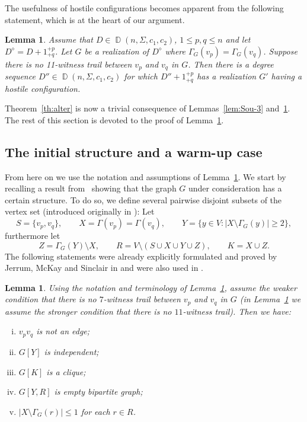 \documentclass[11pt]{elsarticle}
\theoremstyle{plain}
\newtheorem{lemma}[theorem]{Lemma}
\theoremstyle{definition}
\newcommand{\dds}[4]{\operatorname{\mathbb D}(#1,#2,#3,#4)}
\begin{document}
The usefulness of hostile configurations becomes apparent from the following statement, which is at the heart of our argument.

\begin{lemma}\label{lem:key}
   Assume that  $D\in \dds{n}{\Sigma}{c_1}{c_2}$, $1\le p,q\le n$ and  let $D^\diamond=D+ 1^{+p}_{+q}$.  Let $G$ be a realization of
$D^\diamond$ where $\Gamma_G(v_p)=\Gamma_G(v_q)$. Suppose there is no 11-witness trail between $v_p$ and $v_q$ in $G$. Then there is a degree sequence $D''\in \dds{n}{\Sigma}{c_1}{c_2}$ for which $D'' + 1^{+p}_{+q}$ has a realization $G'$ having a hostile configuration.
\end{lemma}

Theorem~\ref{th:alter} is now a trivial consequence of Lemmas~\ref{lem:Sou-3} and~\ref{lem:key}. The rest of this section is devoted to the proof of Lemma~\ref{lem:key}.

\subsection{The initial structure and a warm-up case}\label{sec:initial}

From here on we use the notation and assumptions of Lemma~\ref{lem:key}. We start by recalling a result from~\cite{JMS92} showing that the graph $G$ under consideration has a certain structure. To do so, we define several pairwise disjoint subsets of the vertex set (introduced originally in \cite{JMS92}): Let
\begin{displaymath}
    S=\{v_p,v_q\},\qquad X= \Gamma(v_p) = \Gamma(v_q), \qquad Y=\{y\in V: |X\setminus \Gamma_G(y)|\ge 2\},
\end{displaymath}
furthermore let
\begin{displaymath}
    Z=\Gamma_G(Y)\setminus X,\qquad R=V\setminus (S\cup X\cup Y\cup Z),\qquad K=X\cup Z.
\end{displaymath}
The following statements were already explicitly formulated and proved  by Jerrum, McKay and Sinclair in \cite[Proof of Lemma 1]{JMS92} and were also used in
\cite[Proof of Lemma 4.5]{fully}.
\begin{lemma}\label{th:L1}
    Using the notation and terminology of Lemma~\ref{lem:key},
    assume the weaker condition that there is no $7$-witness trail between $v_p$ and $v_q$ in $G$
    (\emph{in Lemma~\ref{lem:key} we assume the stronger condition that there is no $11$-witness trail}).
    Then we have:
\begin{enumerate}[(i)]
\item $v_pv_q$ is not an edge;
\item $G[Y]$ is independent;
\item $G[K]$ is a clique;
\item $G[Y,R]$ is empty bipartite graph;
\item \label{en:Xr}$|X\setminus \Gamma_G(r)|\le 1$ for each $r\in R$.
\end{enumerate}
\end{lemma}
\end{document}
